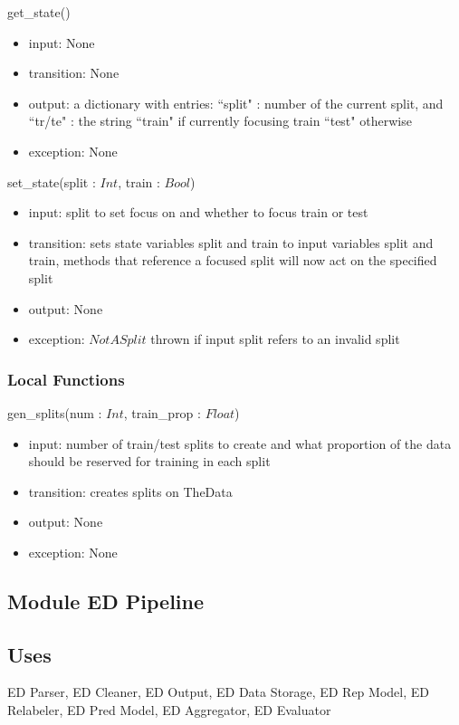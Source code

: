 \documentclass[12pt, titlepage]{article}
\begin{document}
\noindent get\_state()
\begin{itemize}
\item input: None
\item transition: None
\item output: a dictionary with entries: ``split" : number of the current split, and ``tr/te" : the string ``train" if currently focusing train ``test" otherwise
\item exception: None
\end{itemize}

\noindent set\_state(split : $Int$, train : $Bool$)
\begin{itemize}
\item input: split to set focus on and whether to focus train or test
\item transition: sets state variables split and train to input variables split and train, methods that reference a focused split will now act on the specified split
\item output: None
\item exception: $NotASplit$ thrown if input split refers to an invalid split
\end{itemize}

\subsubsection{Local Functions}

\noindent gen\_splits(num : $Int$, train\_prop : $Float$)
\begin{itemize}
\item input: number of train/test splits to create and what proportion of the data should be reserved for training in each split
\item transition: creates splits on TheData
\item output: None
\item exception: None
\end{itemize}


\subsection{Module ED Pipeline}

\subsection{Uses}

ED Parser, ED Cleaner, ED Output, ED Data Storage, ED Rep Model, ED Relabeler, ED Pred Model, ED Aggregator, ED Evaluator
\end{document}
